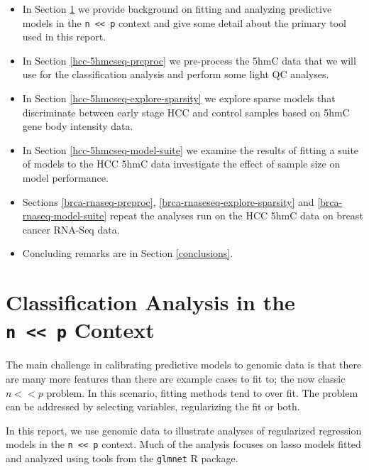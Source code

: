 \documentclass[
]{book}
\providecommand{\tightlist}{%
  \setlength{\itemsep}{0pt}\setlength{\parskip}{0pt}}
\begin{document}
\begin{itemize}
\item
  In Section \ref{modeling-background} we provide background on fitting and
  analyzing predictive models in the \texttt{n\ \textless{}\textless{}\ p} context and
  give some detail about the primary tool used in this report.
\item
  In Section \ref{hcc-5hmcseq-preproc} we pre-process the 5hmC data that
  we will use for the classification analysis and perform some light QC analyses.
\item
  In Section \ref{hcc-5hmcseq-explore-sparsity} we explore sparse models
  that discriminate between early stage HCC and control samples based on
  5hmC gene body intensity data.
\item
  In Section \ref{hcc-5hmcseq-model-suite} we examine the results of fitting a
  suite of models to the HCC 5hmC data investigate the effect of sample
  size on model performance.
\item
  Sections \ref{brca-rnaseq-preproc}, \ref{brca-rnaseseq-explore-sparsity}
  and \ref{brca-rnaseq-model-suite} repeat the analyses run on the HCC 5hmC data
  on breast cancer RNA-Seq data.
\end{itemize}

\begin{itemize}
\tightlist
\item
  Concluding remarks are in Section \ref{conclusions}.
\end{itemize}

\hypertarget{modeling-background}{%
\chapter{\texorpdfstring{Classification Analysis in the \texttt{n\ \textless{}\textless{}\ p} Context}{Classification Analysis in the n \textless\textless{} p Context}}\label{modeling-background}}

The main challenge in calibrating predictive models to genomic data is that
there are many more features than there are example cases to fit to;
the now classic \(n << p\) problem.
In this scenario, fitting methods tend to over fit. The problem
can be addressed by selecting variables, regularizing the fit or both.

In this report, we use genomic data to illustrate analyses of regularized regression
models in the \texttt{n\ \textless{}\textless{}\ p} context. Much of the analysis focuses on lasso models fitted
and analyzed using tools from the \texttt{glmnet} R package.
\end{document}
